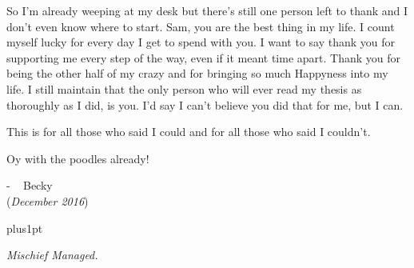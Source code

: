 \documentclass[12pt,useAMS]{ociamthesis}  %
\begin{document}
\begin{acknowledgementslong}
So I'm already weeping at my desk but there's still one person left to thank and I don't even know where to start. Sam, you are the best thing in my life. I count myself lucky for every day I get to spend with you. I want to say thank you for supporting me every step of the way, even if it meant time apart. Thank you for being the other half of my crazy and for bringing so much Happyness into my life. I still maintain that the only person who will ever read my thesis as thoroughly as I did, is you. I'd say I can't believe you did that for me, but I can. 

This is for all those who said I could and for all those who said I couldn't.  

Oy with the poodles already!


\begin{flushright}
- ~ Becky 
\\
(\emph{December 2016})
\end{flushright}

\end{acknowledgementslong}

\begin{romanpages}          %
\tableofcontents            %
\listoffigures              %
\end{romanpages}            %


\baselineskip=18pt plus1pt
\linespread{1.2}
 \setlength{\parskip}{1em}
 






%




\newpage
\vspace*{3cm}

\begin{center}

\emph{Mischief Managed.}
\end{center}
\end{document}
